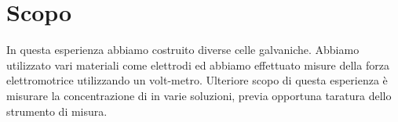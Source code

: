 \section*{Scopo}
In questa esperienza abbiamo costruito diverse celle galvaniche.
Abbiamo utilizzato vari materiali come elettrodi ed abbiamo effettuato misure della forza elettromotrice utilizzando un volt-metro.
Ulteriore scopo di questa esperienza è misurare la concentrazione di  in varie soluzioni, previa opportuna taratura dello strumento di misura.

